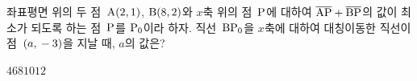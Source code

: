 좌표평면 위의 두 점~$\mathrm{A}(2{,}\mkern3mu 1)$, $\mathrm{B}(8{,}\mkern3mu 2)$와 $x$축 위의 점~$\mathrm{P}$에 대하여 $\overline{\mathrm{AP}}+\overline{\mathrm{BP}}$의 값이 최소가 되도록 하는 점~$\mathrm{P}$를 $\mathrm{P_0}$이라 하자. 직선~$\mathrm{BP_0}$을 $x$축에 대하여 대칭이동한 직선이 점~$(a{,}\mkern3mu -3)$을 지날 때, $a$의 값은?
\begin{choices32}{$4$}{$6$}{$8$}{$10$}{$12$}\end{choices32}
